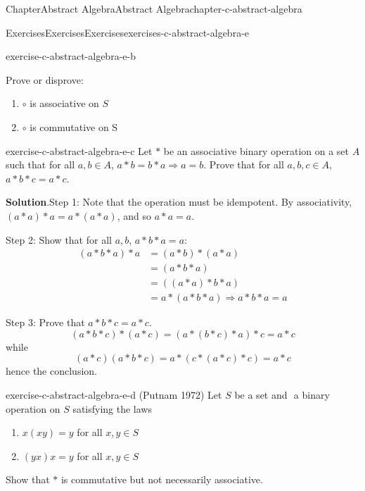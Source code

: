 \documentclass[oneside,10pt,]{book}
\newcommand{\blocktitlefont}{\relax}
\numberwithin{equation}{section}
\begin{document}
\begin{chapterptx}{Chapter}{Abstract Algebra}{}{Abstract Algebra}{}{}{chapter-c-abstract-algebra}
\begin{exercises-section}{Exercises}{Exercises}{}{Exercises}{}{}{exercises-c-abstract-algebra-e}
\begin{divisionexercise}{1}{}{}{exercise-c-abstract-algebra-e-b}
\begin{itemize}[label=\textbullet]
\end{itemize}
%
\par
Prove or disprove:%
\begin{enumerate}[label=(\alph*)]
\item{}\(\circ\)  is associative on \(S\)%
\item{}\(\circ\)  is commutative on S%
\end{enumerate}
%
\end{divisionexercise}%
\begin{divisionexercise}{2}{}{}{exercise-c-abstract-algebra-e-c}%
Let \(*\) be an associative binary operation on a set \(A\) such that for all \(a, b \in A\), \(a*b=b*a \Rightarrow a=b\).  Prove that for all \(a, b, c \in A\), \(a*b*c = a*c\).%
\par\smallskip%
\noindent\textbf{\blocktitlefont Solution}.\hypertarget{solution-c-abstract-algebra-e-c-b}{}\quad{}Step 1: Note that the operation must be idempotent.  By associativity, \((a*a)*a = a*(a*a)\), and so \(a*a=a\).%
\par
Step 2: Show that for all \(a, b\), \(a*b*a=a\):%
\begin{equation*}
\begin{split}
(a*b*a)*a &= (a*b)*(a*a)\\
&=(a*b*a)\\
&=((a*a)*b*a)\\
&= a*(a*b*a) \Rightarrow a*b*a = a
\end{split}
\end{equation*}
%
\par
Step 3: Prove that \(a*b*c=a*c\).%
\begin{equation*}
(a*b*c)*(a*c)= (a*(b*c)*a)*c = a*c
\end{equation*}
while%
\begin{equation*}
(a*c)(a*b*c)= a*(c*(a*c)*c)= a*c
\end{equation*}
hence the conclusion.%
\end{divisionexercise}%
\begin{divisionexercise}{3}{}{}{exercise-c-abstract-algebra-e-d}%
(Putnam 1972) Let \(S\) be a set and \(\) a binary operation on \(S\) satisfying the laws%
\begin{enumerate}[label=(\roman*)]
\item{}\(x(xy)=y\) for all \(x,y \in S\)%
\item{}\((yx)x=y\) for all \(x,y \in S\)%
\end{enumerate}
Show that \(*\) is commutative but not necessarily associative.%
\par\smallskip%

\end{divisionexercise}
\end{exercises-section}
\end{chapterptx}
\end{document}
